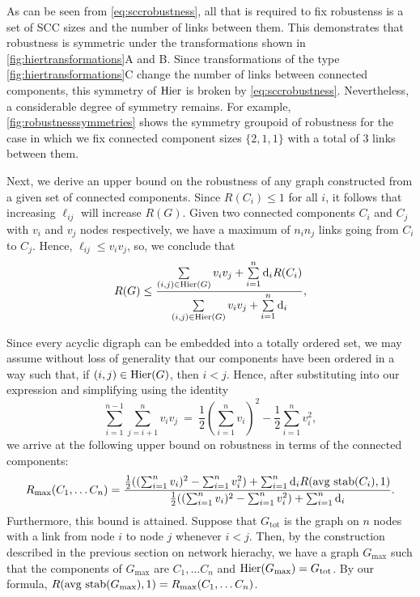 As can be seen from \ref{eq:sccrobustness}, all that is required to fix robustenss is a set of SCC sizes and the number of links between them. This demonstrates that robustness is symmetric under the transformations shown in \ref{fig:hiertransformations}A and B. Since transformations of the type \ref{fig:hiertransformations}C change the number of links between connected components, this symmetry of $\mathrm{Hier}$ is broken by \ref{eq:sccrobustness}. Nevertheless, a considerable degree of symmetry remains. For example, \ref{fig:robustnesssymmetries} shows the symmetry groupoid of robustness for the case in which we fix connected component sizes $\{2,1,1\}$ with a total of $3$ links between them.

Next, we derive an upper bound on the robustness of any graph
constructed from a given set of connected components.  Since
$R(C_i) \le 1$ for all $i$, it follows that increasing $\ell_{ij}$ will
increase $R(G)$.  Given two connected components $C_i$ and $C_j$ with
$v_i$ and $v_j$ nodes respectively, we have a maximum of $n_i n_j$
links going from $C_i$ to $C_j$.  Hence, $\ell_{ij} \le v_i v_j$, so,
we conclude that
\begin{align}
R(G) \le \frac{\sum\limits_{(i,j) \in \mathrm{Hier}(G)} v_i v_j +
               \sum\limits_{i=1}^n \mathrm{d}_i R(C_i)}
              {\sum\limits_{(i,j) \in \mathrm{Hier}(G)} v_i v_j +
               \sum\limits_{i=1}^n \mathrm{d}_i},
\end{align}

Since every acyclic digraph can be embedded into a totally ordered
set, we may assume without loss of generality that our components have
been ordered in a way such that, if $(i,j) \in \mathrm{Hier}(G)$, then $i <
j$.  Hence, after substituting into our expression and simplifying
using the identity
$$\sum_{i=1}^{n-1}\sum_{j=i+1}^{n}v_i
v_j~=~\frac{1}{2} \left( \sum_{i=1}^{n} v_i \right)^2-\frac{1}{2} \sum_{i=1}^{n}
v_i^2,$$
we arrive at the following upper bound on robustness in terms
of the connected components:
\begin{align} \label{eq:sccmaxrobustness}
R_{\mathrm{max}}(C_1, \ldots C_n) =
\frac{\frac{1}{2} ((\sum_{i=1}^n v_i)^2 - \sum_{i=1}^n v_i^2) +
                    \sum_{i=1}^n \mathrm{d}_i R(\hbox{avg stab}(C_i),1)}
     {\frac{1}{2} ((\sum_{i=1}^n v_i)^2 - \sum_{i=1}^n v_i^2) +
                    \sum_{i=1}^n \mathrm{d}_i}.
\end{align}
Furthermore, this bound is attained.  Suppose that $G_{\mathrm{tot}}$
is the graph on $n$ nodes with a link from node $i$ to node $j$
whenever $i < j$.  Then, by the construction described in the previous
section on network hierachy, we have a graph $G_{\mathrm{max}}$ such
that the components of $G_{\mathrm{max}}$ are $C_1, \ldots C_n$ and
$\mathrm{Hier} (G_{\mathrm{max}}) = G_{\mathrm{tot}}$.  By our formula,
$R(\hbox{avg stab} (G_{\mathrm{max}}), 1) = R_{\mathrm{max}}(C_1, \ldots C_n)$.

